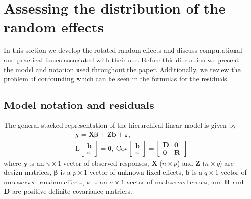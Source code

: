 \documentclass[12pt]{article} %
\newcommand{\E}{\ensuremath{\mathrm{E}}}
\newcommand{\cov}{\ensuremath{\mathrm{Cov}}}
\begin{document}
\section{Assessing the distribution of the random effects}\label{sec:methods}

In this section we develop the rotated random effects and discuss computational and practical issues associated with their use. Before this discussion we present the model and notation used throughout the paper. Additionally, we review the problem of confounding which can be seen in the formulas for the residuals.

\subsection{Model notation and residuals}\label{sec:resid}

The general stacked representation of the hierarchical linear model is given by
%
\begin{eqnarray}\label{eq:hlm}
 && \bm{y} = \bm{X \beta} + \bm{Z b} + \bm{\varepsilon}, \\ \nonumber
 && \E \begin{bmatrix} \bm{b} \\ \bm{\varepsilon} \end{bmatrix} = \bm{0}, 
 \ \cov \begin{bmatrix} \bm{b} \\ \bm{\varepsilon} \end{bmatrix} = 
  	\begin{bmatrix} \bm{D} & \bm{0}\\ \bm{0} & \bm{R} \end{bmatrix}
\end{eqnarray}
%
where $\bm{y}$ is an $n \times 1$ vector of observed responses, $\bm{X}$ ($n \times p$) and $\bm{Z}$ ($n \times q$) are design matrices, $\bm{\beta}$ is a $p \times 1$ vector of unknown fixed effects, $\bm{b}$ is a $q \times 1$ vector of unobserved random effects, $\bm{\varepsilon}$ is an $n \times 1$ vector of unobserved errors, and $\bm{R}$ and $\bm{D}$ are positive definite covariance matrices.
\end{document}
